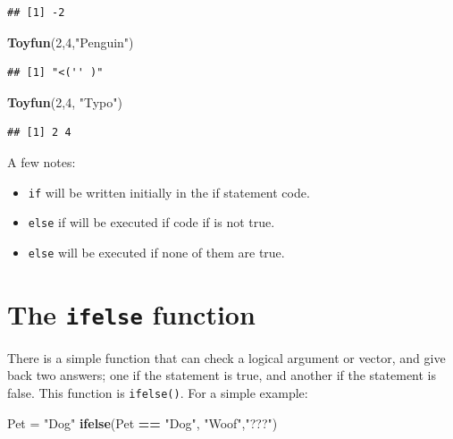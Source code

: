 \documentclass[
]{book}
\newenvironment{Shaded}{\begin{snugshade}}{\end{snugshade}}
\newcommand{\DecValTok}[1]{\textcolor[rgb]{0.00,0.00,0.81}{#1}}
\newcommand{\KeywordTok}[1]{\textcolor[rgb]{0.13,0.29,0.53}{\textbf{#1}}}
\newcommand{\NormalTok}[1]{#1}
\newcommand{\OperatorTok}[1]{\textcolor[rgb]{0.81,0.36,0.00}{\textbf{#1}}}
\newcommand{\StringTok}[1]{\textcolor[rgb]{0.31,0.60,0.02}{#1}}
\begin{document}
\begin{verbatim}
## [1] -2
\end{verbatim}

\begin{Shaded}
\begin{Highlighting}[]
\KeywordTok{Toyfun}\NormalTok{(}\DecValTok{2}\NormalTok{,}\DecValTok{4}\NormalTok{,}\StringTok{"Penguin"}\NormalTok{)}
\end{Highlighting}
\end{Shaded}

\begin{verbatim}
## [1] "<('' )"
\end{verbatim}

\begin{Shaded}
\begin{Highlighting}[]
\KeywordTok{Toyfun}\NormalTok{(}\DecValTok{2}\NormalTok{,}\DecValTok{4}\NormalTok{, }\StringTok{"Typo"}\NormalTok{)}
\end{Highlighting}
\end{Shaded}

\begin{verbatim}
## [1] 2 4
\end{verbatim}

A few notes:

\begin{itemize}
\item
  \texttt{if} will be written initially in the if statement code.
\item
  \texttt{else} if will be executed if code if is not true.
\item
  \texttt{else} will be executed if none of them are true.
\end{itemize}

\hypertarget{the-ifelse-function}{%
\section{\texorpdfstring{The \texttt{ifelse} function}{The ifelse function}}\label{the-ifelse-function}}

There is a simple function that can check a logical argument or vector, and give back two answers; one if the statement is
true, and another if the statement is false. This function is \texttt{ifelse()}. For a simple example:

\begin{Shaded}
\begin{Highlighting}[]
\NormalTok{Pet =}\StringTok{ "Dog"}
\KeywordTok{ifelse}\NormalTok{(Pet }\OperatorTok{==}\StringTok{ "Dog"}\NormalTok{, }\StringTok{"Woof"}\NormalTok{,}\StringTok{"???"}\NormalTok{)}
\end{Highlighting}
\end{Shaded}
\end{document}
